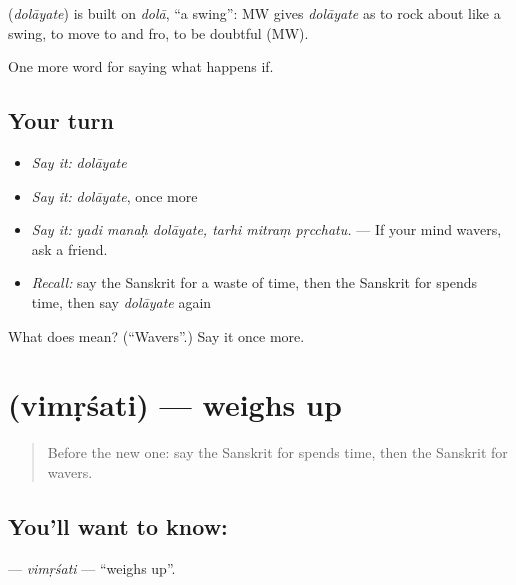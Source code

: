 \begin{cousinweb}
\textbf{} (\emph{dolāyate}) is built on \emph{dolā}, \textquotedblleft{}a swing\textquotedblright{}: MW gives \emph{dolāyate} as to rock about like a swing, to move to and fro, to be doubtful (MW).
\end{cousinweb}

\begin{grammarlens}[title={What you've built}]
One more word for saying what happens if.
\end{grammarlens}

\subsection*{Your turn}
\begin{itemize}
\raggedright
  \item \emph{Say it:} \emph{dolāyate}
  \item \emph{Say it:} \emph{dolāyate}, once more
  \item \emph{Say it:} \emph{yadi manaḥ dolāyate, tarhi mitraṃ pṛcchatu.} — If your mind wavers, ask a friend.
  \item \emph{Recall:} say the Sanskrit for a waste of time, then the Sanskrit for spends time, then say \emph{dolāyate} again
\end{itemize}

\begin{tcolorbox}[breakable,colback=teal!4,colframe=teal!35!black,title={Before you move on}]
What does  mean? (\textquotedblleft{}Wavers\textquotedblright{}.) Say it once more.
\end{tcolorbox}
\section[\texorpdfstring{\sk{विमृशति} (vimṛśati)}{विमृशति (vimṛśati)}]{ (vimṛśati) — weighs up}

\label{lesson:SA-C541-vimrsati}



\begin{quote}
Before the new one: say the Sanskrit for spends time, then the Sanskrit for wavers.
\end{quote}

\subsection*{You'll want to know: }
\textbf{} — \emph{vimṛśati} — \textquotedblleft{}weighs up\textquotedblright{}.

